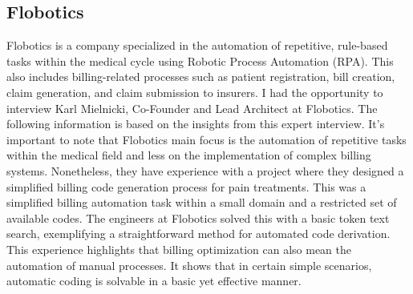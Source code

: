 \subsection{Flobotics}\label{subsec:flobotics}
Flobotics is a company specialized in the automation of repetitive, rule-based tasks within the medical cycle using Robotic Process Automation (RPA).
This also includes billing-related processes such as patient registration, bill creation, claim generation, and claim submission to insurers.
I had the opportunity to interview Karl Mielnicki, Co-Founder and Lead Architect at Flobotics.
The following information is based on the insights from this expert interview.
It's important to note that Flobotics main focus is the automation of repetitive tasks within the medical field and less on the implementation of complex billing systems.
Nonetheless, they have experience with a project where they designed a simplified billing code generation process for pain treatments.
This was a simplified billing automation task within a small domain and a restricted set of available codes.
The engineers at Flobotics solved this with a basic token text search, exemplifying a straightforward method for automated code derivation.
This experience highlights that billing optimization can also mean the automation of manual processes.
It shows that in certain simple scenarios, automatic coding is solvable in a basic yet effective manner.

